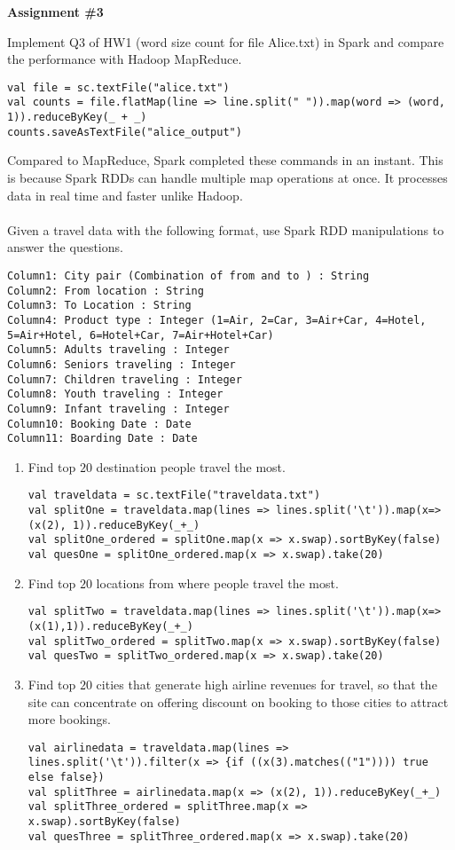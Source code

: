 \documentclass[11pt]{article}
\newcommand{\ques}[1]{\noindent {\bf Question #1: }}
\begin{document}
\begin{center} \textbf{Assignment \#3} \end{center}

\ques{1} Implement Q3 of HW1 (word size count for file Alice.txt) in Spark and compare the performance with Hadoop MapReduce. 
\begin{lstlisting}
val file = sc.textFile("alice.txt")
val counts = file.flatMap(line => line.split(" ")).map(word => (word, 1)).reduceByKey(_ + _)
counts.saveAsTextFile("alice_output")
\end{lstlisting}
Compared to MapReduce, Spark completed these commands in an instant. This is because Spark RDDs can handle multiple map operations at once. It processes data in real time and faster unlike Hadoop. 
\\~\\
\ques{2} Given a travel data with the following format, use Spark RDD manipulations to answer the questions. 
\begin{verbatim} 
Column1: City pair (Combination of from and to ) : String
Column2: From location : String
Column3: To Location : String
Column4: Product type : Integer (1=Air, 2=Car, 3=Air+Car, 4=Hotel,
5=Air+Hotel, 6=Hotel+Car, 7=Air+Hotel+Car)
Column5: Adults traveling : Integer
Column6: Seniors traveling : Integer
Column7: Children traveling : Integer
Column8: Youth traveling : Integer
Column9: Infant traveling : Integer
Column10: Booking Date : Date
Column11: Boarding Date : Date
\end{verbatim}
\begin{enumerate}
\item Find top $20$ destination people travel the most. 

\begin{lstlisting}
val traveldata = sc.textFile("traveldata.txt")
val splitOne = traveldata.map(lines => lines.split('\t')).map(x=>(x(2), 1)).reduceByKey(_+_)
val splitOne_ordered = splitOne.map(x => x.swap).sortByKey(false)
val quesOne = splitOne_ordered.map(x => x.swap).take(20)
\end{lstlisting}
\item Find top $20$ locations from where people travel the most. 
\begin{lstlisting}
val splitTwo = traveldata.map(lines => lines.split('\t')).map(x=>(x(1),1)).reduceByKey(_+_)
val splitTwo_ordered = splitTwo.map(x => x.swap).sortByKey(false)
val quesTwo = splitTwo_ordered.map(x => x.swap).take(20)
\end{lstlisting}
\item Find top $20$ cities that generate high airline revenues for travel, so that the site can concentrate on offering discount on booking to those cities to attract more bookings. 
\begin{lstlisting}
val airlinedata = traveldata.map(lines => lines.split('\t')).filter(x => {if ((x(3).matches(("1")))) true else false})
val splitThree = airlinedata.map(x => (x(2), 1)).reduceByKey(_+_)
val splitThree_ordered = splitThree.map(x => x.swap).sortByKey(false)
val quesThree = splitThree_ordered.map(x => x.swap).take(20)
\end{lstlisting}

\end{enumerate}
\end{document}
